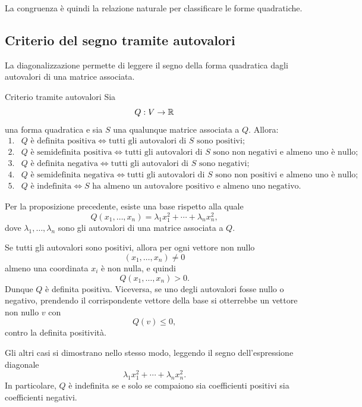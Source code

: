 \documentclass[a4paper]{article}
\begin{document}
La congruenza è quindi la relazione naturale per classificare le forme quadratiche.

\subsection{Criterio del segno tramite autovalori}

La diagonalizzazione permette di leggere il segno della forma quadratica dagli autovalori di una matrice associata.

\begin{snippetproposition}{Criterio tramite autovalori}
    Sia
    \[
        Q:V\to\mathbb{R}
    \]
    una forma quadratica e sia \(S\) una qualunque matrice associata a \(Q\). Allora:
    \[
        \begin{array}{ll}
            \text{1.} &
            Q \text{ è definita positiva}
            \Longleftrightarrow
            \text{tutti gli autovalori di } S \text{ sono positivi};\\[1mm]
            \text{2.} &
            Q \text{ è semidefinita positiva}
            \Longleftrightarrow
            \text{tutti gli autovalori di } S \text{ sono non negativi}
            \text{ e almeno uno è nullo};\\[1mm]
            \text{3.} &
            Q \text{ è definita negativa}
            \Longleftrightarrow
            \text{tutti gli autovalori di } S \text{ sono negativi};\\[1mm]
            \text{4.} &
            Q \text{ è semidefinita negativa}
            \Longleftrightarrow
            \text{tutti gli autovalori di } S \text{ sono non positivi}
            \text{ e almeno uno è nullo};\\[1mm]
            \text{5.} &
            Q \text{ è indefinita}
            \Longleftrightarrow
            S \text{ ha almeno un autovalore positivo e almeno uno negativo}.
        \end{array}
    \]
\end{snippetproposition}

\begin{snippetproof}{}
    Per la proposizione precedente, esiste una base rispetto alla quale
    \[
        Q(x_1,\ldots,x_n)
        =
        \lambda_1x_1^2+\cdots+\lambda_nx_n^2,
    \]
    dove \(\lambda_1,\ldots,\lambda_n\) sono gli autovalori di una matrice associata a \(Q\).

    Se tutti gli autovalori sono positivi, allora per ogni vettore non nullo
    \[
        (x_1,\ldots,x_n)\neq 0
    \]
    almeno una coordinata \(x_i\) è non nulla, e quindi
    \[
        Q(x_1,\ldots,x_n)>0.
    \]
    Dunque \(Q\) è definita positiva. Viceversa, se uno degli autovalori fosse nullo o negativo, prendendo il corrispondente vettore della base si otterrebbe un vettore non nullo \(v\) con
    \[
        Q(v)\leq 0,
    \]
    contro la definita positività.

    Gli altri casi si dimostrano nello stesso modo, leggendo il segno dell'espressione diagonale
    \[
        \lambda_1x_1^2+\cdots+\lambda_nx_n^2.
    \]
    In particolare, \(Q\) è indefinita se e solo se compaiono sia coefficienti positivi sia coefficienti negativi.
\end{snippetproof}
\end{document}

